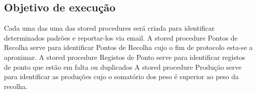 \subsection{Objetivo de execução}
Cada uma das uma das stored procedures será criada para identificar determinados padrões e reportar-los via email.
A stored procedure Pontos de Recolha serve para identificar Pontos de Recolha cujo o fim de protocolo esta-se a aproximar.
A stored procedure Registos de Ponto serve para identificar registos de ponto que estão em falta ou duplicados
A stored procedure Produção serve para identificar as produções cujo o somatório dos peso é superior ao peso da recolha. 
